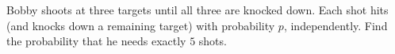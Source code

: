 Bobby shoots at three targets until all three are knocked down. Each shot hits (and knocks down a remaining target) with probability $p$, independently. Find the probability that he needs exactly $5$ shots.
